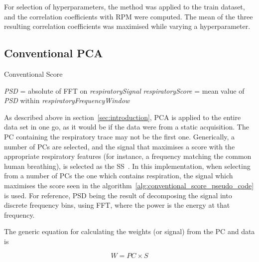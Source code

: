        For selection of hyperparameters, the method was applied to the train dataset, and the correlation coefficients with \gls{RPM} were computed. The mean of the three resulting correlation coefficients was maximised while varying a hyperparameter.
        
    \subsection{Conventional PCA} \label{sec:conventional_pca}
        \begin{algorithm} \label{alg:conventional_score_pseudo_code}
            \caption{Conventional Score}
            \;
            \;
            \textit{PSD} = absolute of \gls{FFT} on \textit{respiratorySignal}\;
            \;
            \textit{respiratoryScore} = mean value of \textit{PSD}  within \textit{respiratoryFrequencyWindow}\;
            \;
        \end{algorithm}
        
        As described above in section~\ref{sec:introduction}, \gls{PCA} is applied to the entire data set in one go, as it would be if the data were from a static acquisition. The \gls{PC} containing the respiratory trace may not be the first one. Generically, a number of \glspl{PC} are selected, and the signal that maximises a score with the appropriate respiratory features (for instance, a frequency matching the common human breathing), is selected as the \gls{SS}~\parencite{Bertolli2017}. In this implementation, when selecting from a number of \glspl{PC} the one which contains respiration, the signal which maximises the score seen in the algorithm~\ref{alg:conventional_score_pseudo_code} is used. For reference, \gls{PSD} being the result of decomposing the signal into discrete frequency bins, using \gls{FFT}, where the power is the energy at that frequency.
        
        The generic equation for calculating the weights (or signal) from the \gls{PC} and data is
            
        \begin{equation} \label{eq:pc_weights}
            W = PC \times S
        \end{equation}
            
